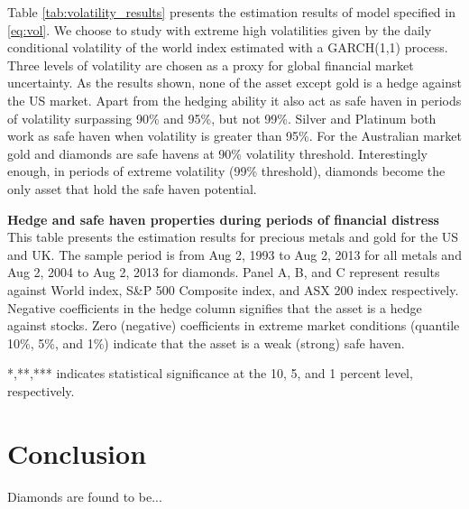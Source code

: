 \documentclass[preprint,authoryear,11pt]{elsarticle}
\begin{document}
Table \ref{tab:volatility_results} presents the estimation results of model specified in \eqref{eq:vol}. We choose to study with extreme high volatilities given by the daily conditional volatility of the world index estimated with a GARCH(1,1) process. Three levels of volatility are chosen as a proxy for global financial market uncertainty. As the results shown, none of the asset except gold is a hedge against the US market. Apart from the hedging ability it also act as safe haven in periods of volatility surpassing 90\% and 95\%, but not 99\%. Silver and Platinum both work as safe haven when volatility is greater than 95\%. For the Australian market gold and diamonds are safe havens at 90\% volatility threshold. Interestingly enough, in periods of extreme volatility (99\% threshold), diamonds become the only asset that hold the safe haven potential.

\begin{table}[htp!]
\scriptsize
\centering
\captionsetup{labelfont=bf,font=footnotesize,skip=0.1cm}
\caption{\textbf{Hedge and safe haven properties during periods of financial distress}\\
This table presents the estimation results for precious metals and gold for the US and UK. The sample period is from Aug 2, 1993 to Aug 2, 2013 for all metals and Aug 2, 2004 to Aug 2, 2013 for diamonds. Panel A, B, and C represent results against World index, S\&P 500 Composite index, and ASX 200 index respectively. Negative coefficients in the hedge column signifies that the asset is a hedge against stocks. Zero (negative) coefficients in extreme market conditions (quantile 10\%, 5\%, and 1\%) indicate that the asset is a weak (strong) safe haven.} \label{tab:us_uk_fin_distress}
\begin{threeparttable}

\begin{tablenotes}
\item [*,**,***] indicates statistical significance at the 10, 5, and 1 percent level, respectively.
\end{tablenotes}
\end{threeparttable}
\end{table}


\glsresetall
\section{Conclusion}
\label{sec:conclusion}
Diamonds are found to be...



\end{document}
